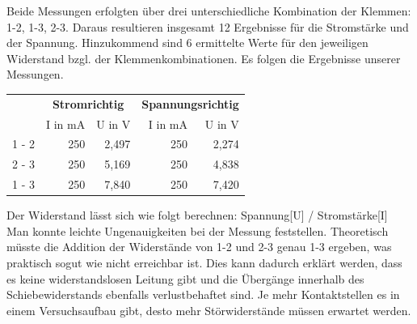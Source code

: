 \documentclass[a4paper,11pt]{article}
\begin{document}
\begin{figure}[h!]
  \begin{center}
\end{center}
\end{figure}

Beide Messungen erfolgten über drei unterschiedliche Kombination der Klemmen: 1-2, 1-3, 2-3.
Daraus resultieren insgesamt 12 Ergebnisse für die Stromstärke und der Spannung. Hinzukommend sind 6 ermittelte Werte für den jeweiligen Widerstand bzgl. der Klemmenkombinationen.  
Es folgen die Ergebnisse unserer Messungen.

\begin{center}
\begin{tabular}{c|rr|rr}
  & \multicolumn{2}{c|}{\textbf{Stromrichtig}}
  & \multicolumn{2}{c}{\textbf{Spannungsrichtig}} \\
  & I in mA & U in V & I in mA & U in V \\
  \hline
  1 - 2 & 250 & 2,497 & 250 & 2,274 \\
  2 - 3 & 250 & 5,169 & 250 &  4,838\\
  1 - 3 & 250 & 7,840 & 250 &  7,420\\
\end{tabular}
\end{center}

Der Widerstand lässt sich wie folgt berechnen:  Spannung[U] / Stromstärke[I]
Man konnte leichte Ungenauigkeiten bei der Messung feststellen. Theoretisch müsste die Addition der Widerstände von 1-2 und 2-3 genau 1-3 ergeben, was praktisch sogut wie nicht erreichbar ist. Dies kann dadurch erklärt werden, dass es keine widerstandslosen Leitung gibt und die Übergänge innerhalb des Schiebewiderstands ebenfalls verlustbehaftet sind. 
Je mehr Kontaktstellen es in einem Versuchsaufbau gibt, desto mehr Störwiderstände müssen erwartet werden. 
\end{document}
